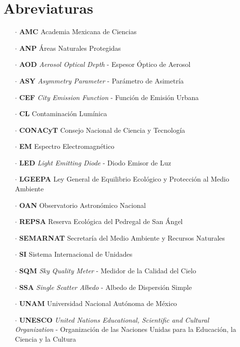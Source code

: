 \chapter{Abreviaturas}

\begin{itemize}

\item[$\cdot$] \textbf{AMC} Academia Mexicana de Ciencias

\item[$\cdot$] \textbf{ANP} Áreas Naturales Protegidas

\item[$\cdot$] \textbf{AOD} \textit{Aerosol Optical Depth} - Espesor Óptico de Aerosol

\item[$\cdot$] \textbf{ASY} \textit{Asymmetry Parameter} - Parámetro de Asimetría

\item[$\cdot$] \textbf{CEF} \textit{City Emission Function} - Función de Emisión Urbana

\item[$\cdot$] \textbf{CL} Contaminación Lumínica

\item[$\cdot$] \textbf{CONACyT} Consejo Nacional de Ciencia y Tecnología

\item[$\cdot$] \textbf{EM} Espectro Electromagnético

\item[$\cdot$] \textbf{LED} \textit{Light Emitting Diode} - Diodo Emisor de Luz

\item[$\cdot$] \textbf{LGEEPA} Ley General de Equilibrio Ecológico y Protección al Medio Ambiente

\item[$\cdot$] \textbf{OAN} Observatorio Astronómico Nacional

\item[$\cdot$] \textbf{REPSA} Reserva Ecológica del Pedregal de San Ángel

\item[$\cdot$] \textbf{SEMARNAT} Secretaría del Medio Ambiente y Recursos Naturales

\item[$\cdot$] \textbf{SI} Sistema Internacional de Unidades

\item[$\cdot$] \textbf{SQM} \textit{Sky Quality Meter} - Medidor de la Calidad del Cielo

\item[$\cdot$] \textbf{SSA} \textit{Single Scatter Albedo} - Albedo de Dispersión Simple

\item[$\cdot$] \textbf{UNAM} Universidad Nacional Autónoma de México

\item[$\cdot$] \textbf{UNESCO} \textit{United Nations Educational, Scientific and Cultural Organization} - Organización de las Naciones Unidas para la Educación, la Ciencia y la Cultura
			
\end{itemize}